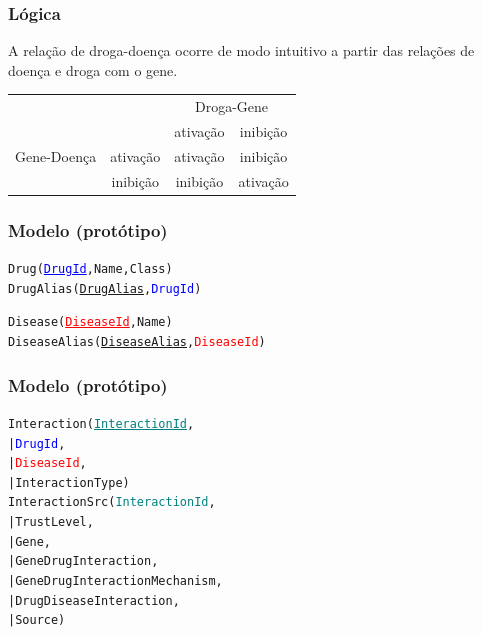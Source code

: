 \documentclass[12pt]{beamer}
\begin{document}
\begin{frame}[fragile]
  \frametitle{Lógica}

  A relação de droga-doença ocorre de modo intuitivo a partir das relações de
  doença e droga com o gene.

  \vspace*{0.1cm}

  \begin{tabular}{| c c | c c |}
    \hline
    & & \multicolumn{2}{c|}{Droga-Gene} \\
    & & ativação & inibição \\
    \hline
    Gene-Doença & ativação & ativação & inibição \\
    & inibição & inibição & ativação \\
    \hline
  \end{tabular}

\end{frame}

\begin{frame}[fragile]
  \frametitle{Modelo (protótipo)}

  \begin{alltt}
    Drug(\textcolor{blue}{\underline{DrugId}}, Name, Class)
    DrugAlias(\underline{DrugAlias}, \textcolor{blue}{DrugId})

    Disease(\textcolor{red}{\underline{DiseaseId}}, Name)
    DiseaseAlias(\underline{DiseaseAlias}, \textcolor{red}{DiseaseId})
  \end{alltt}
\end{frame}

\begin{frame}[fragile]
  \frametitle{Modelo (protótipo)}

  \begin{alltt}
    Interaction(\textcolor{teal}{\underline{InteractionId}},
    |           \textcolor{blue}{DrugId},
    |           \textcolor{red}{DiseaseId},
    |           InteractionType)
    InteractionSrc(\textcolor{teal}{InteractionId},
    |              TrustLevel,
    |              Gene,
    |              GeneDrugInteraction,
    |              GeneDrugInteractionMechanism,
    |              DrugDiseaseInteraction,
    |              Source)
  \end{alltt}
\end{frame}
\end{document}
